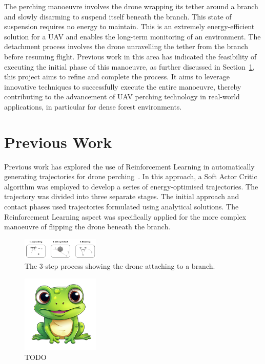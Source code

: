 The perching manoeuvre involves the drone wrapping its tether around a branch and slowly disarming to suspend itself beneath the branch. 
This state of suspension requires no energy to maintain. 
This is an extremely energy-efficient solution for a UAV and enables  the long-term monitoring of an environment. 
The detachment process involves the drone unravelling the tether from the branch before resuming flight. 
Previous work in this area has indicated the feasibility of executing the initial phase of this manoeuvre, as further discussed in Section~\ref{sec:background-prev-work}, this project aims to refine and complete the process. 
It aims to leverage innovative techniques to successfully execute the entire manoeuvre, thereby contributing to the advancement of UAV perching technology in real-world applications, in particular for dense forest environments.

\section{Previous Work}
\label{sec:background-prev-work}


Previous work has explored the use of Reinforcement Learning in automatically generating trajectories for drone perching~\cite{learnedTetheredPerchingFabian}.
In this approach, a Soft Actor Critic algorithm was employed to develop a series of energy-optimised trajectories.
The trajectory was divided into three separate stages.
The initial approach and contact phases used trajectories formulated using analytical solutions.
The Reinforcement Learning aspect was specifically applied for the more complex manoeuvre of flipping the drone beneath the branch.

\begin{figure}[htbp]
  \centering
  \includegraphics[width=0.33\textwidth]{introduction/dronePerching.png}
  \caption{The 3-step process showing the drone attaching to a branch.}
\label{fig:previous-work-manuever-diagram}
\end{figure}

\begin{figure}[htbp]
  \centering
  \includegraphics[width=0.33\textwidth]{frog.png}
  \caption{TODO}
\label{fig:previous-work-rolling}
\end{figure}

